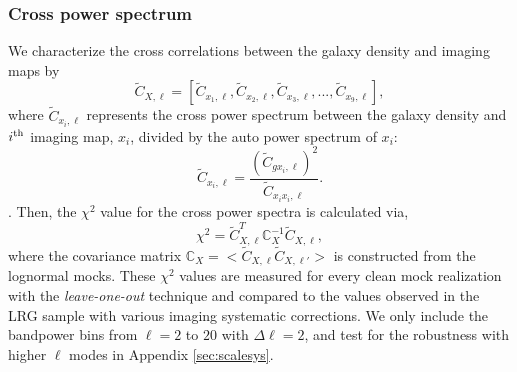\subsubsection{Cross power spectrum}

We characterize the cross correlations between the galaxy density and imaging  maps by 
\begin{equation}
\tilde{C}_{X, \ell} = [\tilde{C}_{x_{1}, \ell}, \tilde{C}_{x_{2}, \ell}, \tilde{C}_{x_{3}, \ell}, ..., \tilde{C}_{x_{9}, \ell}],
\end{equation}
where $\tilde{C}_{x_{i}, \ell}$ represents  the cross power spectrum between the galaxy density and $i^{\rm th}$ imaging map, $x_{i}$, divided by the auto power spectrum of $x_{i}$:
\begin{equation}
\tilde{C}_{x_{i}, \ell} = \frac{(\tilde{C}_{gx_{i}, \ell})^{2}}{\tilde{C}_{x_{i}x_{i},\ell}}.
\end{equation}
. Then, the $\chi^{2}$ value for the cross power spectra is calculated via,
\begin{equation}
\chi^{2} = \tilde{C}^{T}_{X, \ell} \mathbb{C}_{X}^{-1} \tilde{C}_{X, \ell},
\end{equation}
where the covariance matrix $\mathbb{C}_{X} = < \tilde{C}_{X, \ell} \tilde{C}_{X, \ell'} >$ is constructed from the lognormal mocks. These $\chi^{2}$ values are measured for every clean mock realization with the \textit{leave-one-out} technique and compared to the values observed in the LRG sample with various imaging systematic corrections.   We only include the bandpower bins from $\ell=2$ to $20$ with $\Delta\ell=2$, and test for the robustness with higher $\ell$ modes in Appendix \ref{sec:scalesys}. 

